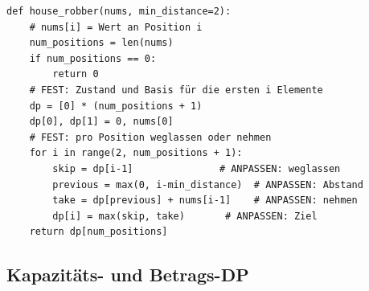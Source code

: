 \begin{codebox}
\begin{lstlisting}[style=CodeExpert]
def house_robber(nums, min_distance=2):
    # nums[i] = Wert an Position i
    num_positions = len(nums)
    if num_positions == 0:
        return 0
    # FEST: Zustand und Basis für die ersten i Elemente
    dp = [0] * (num_positions + 1)
    dp[0], dp[1] = 0, nums[0]
    # FEST: pro Position weglassen oder nehmen
    for i in range(2, num_positions + 1):
        skip = dp[i-1]               # ANPASSEN: weglassen
        previous = max(0, i-min_distance)  # ANPASSEN: Abstand
        take = dp[previous] + nums[i-1]    # ANPASSEN: nehmen
        dp[i] = max(skip, take)       # ANPASSEN: Ziel
    return dp[num_positions]
\end{lstlisting}
\end{codebox}


\subsection{Kapazitäts- und Betrags-DP}\label{sec:03-kapazitaets-dp}

\begin{contentbox}[Musterkarte]
\begin{factlist}
\end{factlist}
\end{contentbox}

